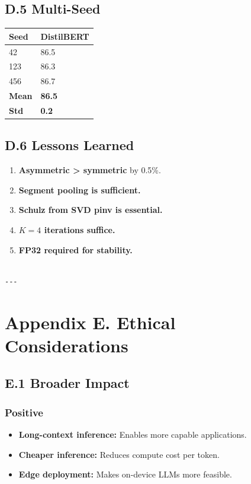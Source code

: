 \subsection{D.5 Multi-Seed}

\begin{table}[H]
\centering
\small
\begin{tabular}{ll}
\toprule
\textbf{Seed} & \textbf{DistilBERT} \\
\midrule
42 & 86.5 \\
123 & 86.3 \\
456 & 86.7 \\
\textbf{Mean} & \textbf{86.5} \\
\textbf{Std} & \textbf{0.2} \\
\bottomrule
\end{tabular}
\end{table}

\subsection{D.6 Lessons Learned}

\begin{enumerate}
\item \textbf{Asymmetric \textgreater{} symmetric} by 0.5\%.
\item \textbf{Segment pooling is sufficient.}
\item \textbf{Schulz from SVD pinv is essential.}
\item \textbf{$K = 4$ iterations suffice.}
\item \textbf{FP32 required for stability.}
\end{enumerate}
\begin{lstlisting}

---
\end{lstlisting}


\section{Appendix E. Ethical Considerations}

\subsection{E.1 Broader Impact}

\subsubsection{Positive}
\begin{itemize}
\item \textbf{Long-context inference:} Enables more capable applications.
\item \textbf{Cheaper inference:} Reduces compute cost per token.
\item \textbf{Edge deployment:} Makes on-device LLMs more feasible.

\end{itemize}
